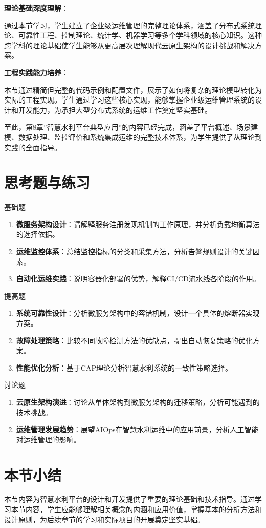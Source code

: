 \textbf{理论基础深度理解}：

通过本节学习，学生建立了企业级运维管理的完整理论体系，涵盖了分布式系统理论、可靠性工程、控制理论、统计学、机器学习等多个学科领域的核心知识。这种跨学科的理论基础使学生能够从更高层次理解现代云原生架构的设计挑战和解决方案。

\textbf{工程实践能力培养}：

本节通过精简但完整的代码示例和配置文件，展示了如何将复杂的理论模型转化为实际的工程实现。学生通过学习这些核心实现，能够掌握企业级运维管理系统的设计和开发能力，为承担大型分布式系统的运维工作奠定坚实基础。

至此，第8章''智慧水利平台典型应用''的内容已经完成，涵盖了平台概述、场景建模、数据处理、监控评价和系统集成运维的完整技术体系，为学生提供了从理论到实践的全面指导。

\section{思考题与练习}

 基础题

\begin{enumerate}
\def\labelenumi{\arabic{enumi}.}
\tightlist
\item
  \textbf{微服务架构设计}：请解释服务注册发现机制的工作原理，并分析负载均衡算法的选择依据。
\item
  \textbf{运维监控体系}：总结监控指标的分类和采集方法，分析告警规则设计的关键因素。
\item
  \textbf{自动化运维实践}：说明容器化部署的优势，解释CI/CD流水线各阶段的作用。
\end{enumerate}

 提高题

\begin{enumerate}
\def\labelenumi{\arabic{enumi}.}
\setcounter{enumi}{3}
\tightlist
\item
  \textbf{系统可靠性设计}：分析微服务架构中的容错机制，设计一个具体的熔断器实现方案。
\item
  \textbf{故障处理策略}：比较不同故障检测方法的优缺点，提出自动恢复策略的优化方案。
\item
  \textbf{性能优化分析}：基于CAP理论分析智慧水利系统的一致性策略选择。
\end{enumerate}

 讨论题

\begin{enumerate}
\def\labelenumi{\arabic{enumi}.}
\setcounter{enumi}{6}
\tightlist
\item
  \textbf{云原生架构演进}：讨论从单体架构到微服务架构的迁移策略，分析可能遇到的技术挑战。
\item
  \textbf{运维管理发展趋势}：展望AIOps在智慧水利运维中的应用前景，分析人工智能对运维管理的影响。
\end{enumerate}

\section{本节小结}

本节内容为智慧水利平台的设计和开发提供了重要的理论基础和技术指导。通过学习本节内容，学生应能够理解相关概念的内涵和应用价值，掌握基本的分析方法和设计原则，为后续章节的学习和实际项目的开展奠定坚实基础。
